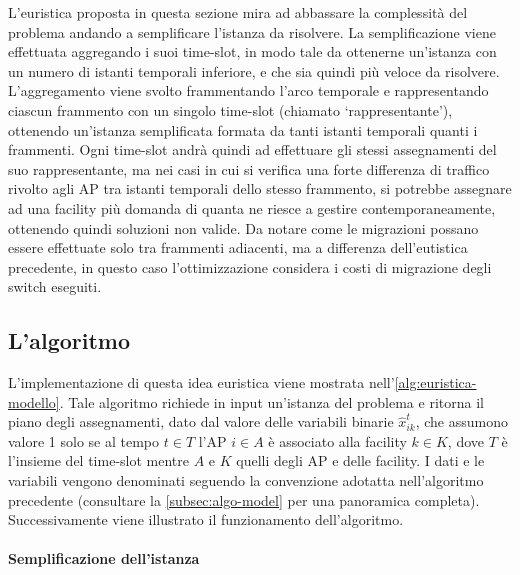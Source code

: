 L'euristica proposta in questa sezione mira ad abbassare la complessità del problema andando a semplificare l'istanza da risolvere. La semplificazione viene effettuata aggregando i suoi time-slot, in modo tale da ottenerne un'istanza con un numero di istanti temporali inferiore, e che sia quindi più veloce da risolvere. L'aggregamento viene svolto frammentando l'arco temporale e rappresentando ciascun frammento con un singolo time-slot (chiamato `rappresentante'), ottenendo un'istanza semplificata formata da tanti istanti temporali quanti i frammenti. Ogni time-slot andrà quindi ad effettuare gli stessi assegnamenti del suo rappresentante, ma nei casi in cui si verifica una forte differenza di traffico rivolto agli AP tra istanti temporali dello stesso frammento, si potrebbe assegnare ad una facility più domanda di quanta ne riesce a gestire contemporaneamente, ottenendo quindi soluzioni non valide. Da notare come le migrazioni possano essere effettuate solo tra frammenti adiacenti, ma a differenza dell'eutistica precedente, in questo caso l'ottimizzazione considera i costi di migrazione degli switch eseguiti.

\subsection{L'algoritmo}
\label{subsec:algo2}



L'implementazione di questa idea euristica viene mostrata nell'\autoref{alg:euristica-modello}. Tale algoritmo richiede in input un'istanza del problema e ritorna il piano degli assegnamenti, dato dal valore delle variabili binarie $\hat{x}^t_{ik}$, che assumono valore 1 solo se al tempo $t \in T$ l'AP $i \in A$ è associato alla facility $k \in K$, dove $T$ è l'insieme del time-slot mentre $A$ e $K$ quelli degli AP e delle facility. I dati e le variabili vengono denominati seguendo la convenzione adotatta nell'algoritmo precedente (consultare la \autoref{subsec:algo-model} per una panoramica completa).\\
Successivamente viene illustrato il funzionamento dell'algoritmo.

\paragraph{Semplificazione dell'istanza}

